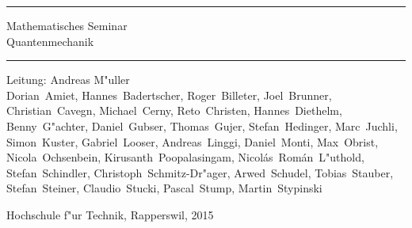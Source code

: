 \documentclass{book}
\begin{document}
\pagestyle{fancy}
\frontmatter
\newcommand\HRule{\noindent\rule{\linewidth}{1.5pt}}
\begin{titlepage}
\HRule
\vspace*{5pt}
\begin{flushright}
{
\LARGE
Mathematisches Seminar\\
\vspace*{20pt}
\Huge
Quantenmechanik%
}
\vspace*{5pt}
\end{flushright}
\HRule
\begin{flushright}
\vspace{60pt}
\Large
Leitung: Andreas M"uller\\
\vspace{40pt}
\Large
Dorian~Amiet, Hannes~Badertscher, Roger~Billeter, Joel~Brunner,
Christian~Cavegn, Michael~Cerny, Reto~Christen, Hannes~Diethelm,
Benny~G"achter, Daniel~Gubser, Thomas~Gujer, Stefan~Hedinger,
Marc~Juchli, Simon~Kuster, Gabriel~Looser, Andreas~Linggi,
Daniel~Monti, Max~Obrist, Nicola~Ochsenbein, Kirusanth~Poopalasingam,
Nicol\'as~Rom\'an~L"uthold, Stefan~Schindler, Christoph~Schmitz-Dr"ager,
Arwed~Schudel, Tobias~Stauber, Stefan~Steiner,
Claudio~Stucki, Pascal~Stump, Martin~Stypinski
\end{flushright}
\begin{center}
Hochschule f"ur Technik, Rapperswil, 2015
\end{center}
\end{titlepage}
\hypersetup{
    colorlinks=true,
    linktoc=all,
    linkcolor=blue
}
\newenvironment{beispiele}{
\bgroup\smallskip\parindent0pt\bf Beispiele\egroup

\begin{list}{\arabic{beispiel}.}
  {\usecounter{beispiel}
  \setlength{\labelsep}{5mm}
  \setlength{\rightmargin}{0pt}
}}{\end{list}}
\newenvironment{uebungsaufgaben}{
\begin{list}{\arabic{uebungsaufgabe}.}
  {\usecounter{uebungsaufgabe}
  \setlength{\labelwidth}{2cm}
  \setlength{\leftmargin}{0pt}
  \setlength{\labelsep}{5mm}
  \setlength{\rightmargin}{0pt}
  \setlength{\itemindent}{0pt}
}}{\end{list}\vfill\pagebreak}
\newenvironment{teilaufgaben}{
\begin{enumerate}
\renewcommand{\labelenumi}{\alph{enumi})}
}{\end{enumerate}}
\end{document}
